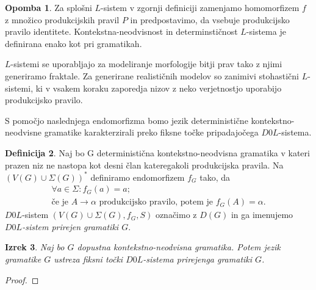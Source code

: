 \documentclass{amsart}
\theoremstyle{definition}
\newtheorem{definicija}{Definicija}[section]
\newtheorem{opomba}[definicija]{Opomba}
\theoremstyle{plain} %
\newtheorem{izrek}[definicija]{Izrek}
\begin{document}
\begin{opomba}
    
    Za splošni $ L $-sistem v zgornji definiciji zamenjamo homomorfizem $ f $ z množico produkcijskih pravil $ P $ in predpostavimo,
    da vsebuje produkcijsko pravilo identitete. Kontekstna-neodvisnost in determinstičnost $ L $-sistema je definirana enako kot pri gramatikah. 
    
    $ L $-sistemi se uporabljajo za modeliranje morfologije bitji prav tako z njimi generiramo fraktale. Za generirane realističnih modelov
    so zanimivi stohastični $ L $-sistemi, ki v vsakem koraku zaporedja nizov z neko verjetnostjo uporabijo produkcijsko pravilo.

\end{opomba}

S pomočjo naslednjega endomorfizma bomo jezik deterministične kontekstno-neodvisne gramatike karakterzirali preko fiksne točke pripadajočega 
$ D0L $-sistema.

\begin{definicija}
    
    Naj bo G deterministična kontekstno-neodvisna gramatika v kateri prazen niz ne nastopa kot desni član kateregakoli
    produkcijska pravila. Na $ (V(G) \cup \Sigma(G))^* $ definiramo endomorfizem $ f_G $ tako, da 
    \begin{gather*}
        \forall a \in \Sigma \colon f_G(a) = a; \\
        \text{če je } A \rightarrow \alpha \text{ produkcijsko pravilo, potem je } f_G(A) = \alpha.
    \end{gather*}
    $ D0L $-sistem $ (V(G) \cup \Sigma(G), f_G, S) $ označimo z $ D(G) $ in ga imenujemo \textit{$ D0L $-sistem prirejen gramatiki $ G $}.

\end{definicija}

\begin{izrek}

    Naj bo $ G $ dopustna kontekstno-neodvisna gramatika. Potem jezik gramatike $ G $ ustreza fiksni točki $ D0L $-sistema prirejenga gramatiki $ G $.

\end{izrek}

\begin{proof}

\end{proof}
\end{document}
